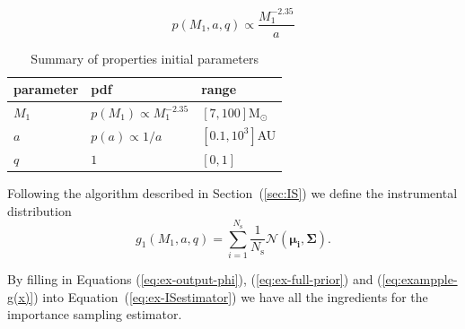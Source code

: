 \documentclass[a4paper,fleqn,usenatbib]{mnras}
\begin{document}
%
%
\begin{equation}
  p(M_1,a,q) \propto \frac{M_1^{-2.35}}{a} 
	\label{eq:ex-full-prior}
\end{equation}
%

\begin{table}[]
\centering
\caption{Summary of properties initial parameters}
\label{my-label}
\begin{tabular}{|l|l|l|}

parameter & pdf & range \\ \hline
$M_1$     &  $p(M_1) \propto M_1^{-2.35}$    & $[7,100] \text{M}_{\odot} $      \\ \hline
$a$       &  $ p(a) \propto 1/a$             & $[0.1,10^3] $AU            \\ \hline
$q$       &   $1$                   		   &  $[0,1] $                  \\ \hline
\end{tabular}
\end{table}
%  
%  
Following the algorithm described in Section~(\ref{sec:IS}) we define the instrumental distribution
\begin{equation}
    g_{1}({M_1,a,q}) = \sum _{i=1}^{N_{\text{s}}} \frac{1}{N_{\text{s}}} \mathcal{N}({\boldsymbol {\mu _{i},\Sigma}}).
	\label{eq:exampple-g(x)}
\end{equation}

By filling in Equations (\ref{eq:ex-output-phi}), (\ref{eq:ex-full-prior}) and (\ref{eq:exampple-g(x)}) into Equation~(\ref{eq:ex-ISestimator}) we have all the ingredients for the importance sampling estimator. 
\end{document}
